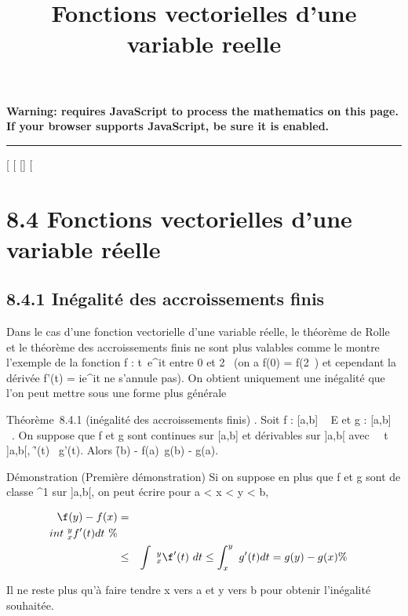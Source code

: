 \documentclass[]{article}
\title{Fonctions vectorielles d'une variable reelle}
\author{}
\date{}
\begin{document}
\maketitle

\textbf{Warning: 
requires JavaScript to process the mathematics on this page.\\ If your
browser supports JavaScript, be sure it is enabled.}

\begin{center}\rule{3in}{0.4pt}\end{center}

[
[
[]
[

\section{8.4 Fonctions vectorielles d'une variable réelle}

\subsection{8.4.1 Inégalité des accroissements finis}

Dans le cas d'une fonction vectorielle d'une variable réelle, le
théorème de Rolle et le théorème des accroissements finis ne sont plus
valables comme le montre l'exemple de la fonction f :
t\mapsto~e^it entre 0 et 2\pi~ (on a f(0) =
f(2\pi~) et cependant la dérivée f'(t) = ie^it ne s'annule pas).
On obtient uniquement une inégalité que l'on peut mettre sous une forme
plus générale

Théorème~8.4.1 (inégalité des accroissements finis) . Soit f : [a,b]
\rightarrow~ E et g : [a,b] \rightarrow~ ~. On suppose que f et g sont continues sur
[a,b] et dérivables sur ]a,b[ avec \forall~~t
\in]a,b[, \f'(t)\ \leq
g'(t). Alors \f(b) -
f(a)\ \leq g(b) - g(a).

Démonstration (Première démonstration) Si on suppose en plus que f et g
sont de classe ^1 sur ]a,b[, on peut écrire pour a
< x < y < b,

\begin{align*} \f(y) -
f(x)& =&
\\int ~
_x^yf'(t) dt\ \%&
\\ & \leq& \int ~
_x^y\f'(t)\
dt \leq\int  _x^y~g'(t) dt = g(y) -
g(x)\%& \\
\end{align*}

Il ne reste plus qu'à faire tendre x vers a et y vers b pour obtenir
l'inégalité souhaitée.
\end{document}
